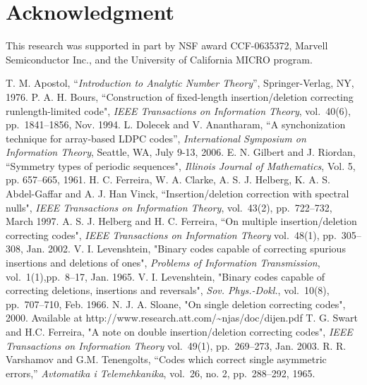 \documentclass[10pt,conference]{IEEEtran}
\begin{document}
\section*{Acknowledgment}
This research was supported in part by
NSF award CCF-0635372,
Marvell Semiconductor Inc., and the University of
California MICRO program.
\begin{thebibliography}{10}
 T. M. Apostol, ``\emph{Introduction to Analytic Number
Theory}'', Springer-Verlag, NY, 1976.
P. A. H. Bours, ``Construction of fixed-length insertion/deletion
correcting runlength-limited code", \emph{IEEE Transactions on
Information Theory}, vol.\ 40(6), pp.~1841--1856, Nov. 1994.
 L. Dolecek and V. Anantharam, ``A synchonization
technique for array-based LDPC codes'', \emph{International
Symposium on Information Theory}, Seattle, WA, July 9-13, 2006.
E. N. Gilbert and J. Riordan, ``Symmetry types of periodic
sequences", \emph{Illinois Journal of Mathematics}, Vol. 5, pp.
657--665, 1961.
H. C. Ferreira, W. A. Clarke, A. S. J. Helberg, K. A. S.
Abdel-Gaffar and A. J. Han Vinck, ``Insertion/deletion correction
with spectral nulls", \emph{IEEE Transactions on Information
Theory}, vol.\ 43(2), pp.~722--732, March 1997.
A. S. J. Helberg and H. C. Ferreira, ``On multiple
insertion/deletion correcting codes", \emph{IEEE Transactions on
Information Theory} vol.\ 48(1), pp.~305--308, Jan. 2002.
V. I. Levenshtein, "Binary codes capable of correcting spurious
insertions and deletions of ones", \emph{Problems of Information
Transmission}, vol.\ 1(1),pp.~8--17, Jan. 1965.
V. I. Levenshtein, "Binary codes capable of correcting deletions,
insertions and reversals", \emph{Sov. Phys.-Dokl.}, vol.\ 10(8),
pp.~707--710, Feb. 1966.
N. J. A. Sloane, "On single deletion correcting codes", 2000.
Available at http://www.research.att.com/\~{ }njas/doc/dijen.pdf
T. G. Swart and H.C. Ferreira, "A note on double insertion/deletion
correcting codes", \emph{IEEE Transactions on Information Theory}
vol.\ 49(1), pp.~269--273, Jan. 2003.
R. R. Varshamov and G.M. Tenengolts, ``Codes which correct single
asymmetric errors,'' \emph{Avtomatika i Telemehkanika}, vol.\ 26,
no. 2, pp.~288--292, 1965.
\end{thebibliography}
\end{document}
